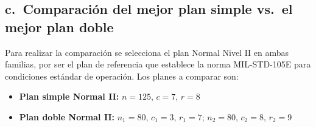 \documentclass[
  12pt,
]{article}
\begin{document}
\subsection{c.~Comparación del mejor plan simple vs.~el mejor plan
doble}\label{c.-comparaciuxf3n-del-mejor-plan-simple-vs.-el-mejor-plan-doble}

Para realizar la comparación se selecciona el plan Normal Nivel II en
ambas familias, por ser el plan de referencia que establece la norma
MIL-STD-105E para condiciones estándar de operación. Los planes a
comparar son:

\begin{itemize}
  \item \textbf{Plan simple Normal II:} $n = 125$, $c = 7$, $r = 8$
  \item \textbf{Plan doble Normal II:} $n_1 = 80$, $c_1 = 3$, $r_1 = 7$; 
        $n_2 = 80$, $c_2 = 8$, $r_2 = 9$
\end{itemize}
\end{document}
